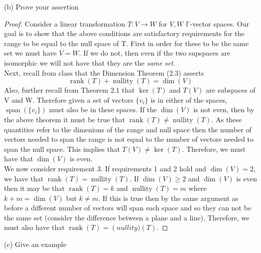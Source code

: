 \documentclass[a4paper, 11pt]{article}
\newcommand{\F}{\mathbb{F}}
\newenvironment{solution}{%
	\begin{list}{}{%
			\setlength{\topsep}{0pt}%
			\setlength{\leftmargin}{1.5cm}%
			\setlength{\rightmargin}{1.5cm}%
			\setlength{\listparindent}{\parindent}%
			\setlength{\itemindent}{\parindent}%
			\setlength{\parsep}{\parskip}%
		}%
		\item[]}{\end{list}}
\begin{document}
\noindent(b) Prove your assertion 
	\begin{solution}
		\begin{proof} 
			\noindent Consider a linear transformation $T:V\to W$ for $V,W$ $\F$-vector spaces. Our goal is to show that the above conditions are satisfactory requirements for the range to be equal to the null space of T. First in order for these to be the same set we must have $V=W$. If we do not, then even if the two supspaces are isomorphic we will not have that they are the \textit{same set}. \\ 
		
			Next, recall from class that the Dimension Theorem (2.3) asserts 
				\begin{equation*}
					\operatorname{rank}(T) + \operatorname{nullity}(T) = \dim(V) 
				\end{equation*}
			Also, further recall from Theorem 2.1 that $\ker(T)$ and $T(V)$ are subspaces of V and W. Therefore given a set of vectors $\{v_i\}$ is in either of the spaces, $\operatorname{span}(\{v_i\})$ must also be in these spaces. If the $\dim(V)$ is not even, then by the above theorem it must be true that $\operatorname{rank}(T)\neq\operatorname{nullity}(T)$. As these quantities refer to the dimenions of the range and null space then the number of vectors needed to span the range is not equal to the number of vectors needed to span the null space. This implies that $T(V)\neq \ker(T)$. Therefore, we must have that $\dim(V)$ is even. \\ 

			We now consider requirement 3. If requirements 1 and 2 hold and $\dim(V)=2$, we have that $\operatorname{rank}(T)=\operatorname{nullity}(T)$. If $\dim(V)\geq 2$ and $\dim(V)$ is even then it may be that $\operatorname{rank}(T) = k$ and $\operatorname{nullity}(T)= m$ where $k+m = \dim(V)$ but $k\neq m$. If this is true then by the same argument as before a different number of vectors will span  each space and so they can not be the same set (consider the difference between a plane and a line). Therefore, we must also have that $\operatorname{rank}(T) = \operatorname(nullity)(T)$. 
		\end{proof} 
	\end{solution} 
\noindent(c) Give an example
\end{document}
